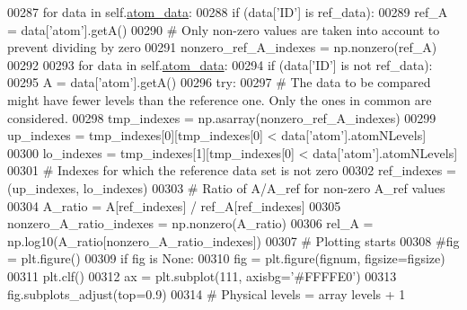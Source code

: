 \begin{DoxyCode}
00287         \textcolor{keywordflow}{for} data \textcolor{keywordflow}{in} self.\hyperlink{classpyneb_1_1plot_1_1plot_atomic_data_1_1_data_plot_aee33ad460a38cb4293a5bd89cec12294}{atom\_data}:
00288             \textcolor{keywordflow}{if} (data[\textcolor{stringliteral}{'ID'}] \textcolor{keywordflow}{is} ref\_data):
00289                 ref\_A = data[\textcolor{stringliteral}{'atom'}].getA()
00290                 \textcolor{comment}{# Only non-zero values are taken into account to prevent dividing by zero}
00291                 nonzero\_ref\_A\_indexes = np.nonzero(ref\_A)
00292 
00293         \textcolor{keywordflow}{for} data \textcolor{keywordflow}{in} self.\hyperlink{classpyneb_1_1plot_1_1plot_atomic_data_1_1_data_plot_aee33ad460a38cb4293a5bd89cec12294}{atom\_data}:
00294             \textcolor{keywordflow}{if} (data[\textcolor{stringliteral}{'ID'}] \textcolor{keywordflow}{is} \textcolor{keywordflow}{not} ref\_data):
00295                 A = data[\textcolor{stringliteral}{'atom'}].getA()
00296                 \textcolor{keywordflow}{try}:
00297                     \textcolor{comment}{# The data to be compared might have fewer levels than the reference one. Only the ones
       in common are considered.}
00298                     tmp\_indexes = np.asarray(nonzero\_ref\_A\_indexes) 
00299                     up\_indexes = tmp\_indexes[0][tmp\_indexes[0] < data[\textcolor{stringliteral}{'atom'}].atomNLevels]
00300                     lo\_indexes = tmp\_indexes[1][tmp\_indexes[0] < data[\textcolor{stringliteral}{'atom'}].atomNLevels]
00301                     \textcolor{comment}{# Indexes for which the reference data set is not zero}
00302                     ref\_indexes = (up\_indexes, lo\_indexes)
00303                     \textcolor{comment}{# Ratio of A/A\_ref for non-zero A\_ref values}
00304                     A\_ratio = A[ref\_indexes] / ref\_A[ref\_indexes]
00305                     nonzero\_A\_ratio\_indexes = np.nonzero(A\_ratio)
00306                     rel\_A = np.log10(A\_ratio[nonzero\_A\_ratio\_indexes])
00307                     \textcolor{comment}{# Plotting starts}
00308                     \textcolor{comment}{#fig = plt.figure()}
00309                     \textcolor{keywordflow}{if} fig \textcolor{keywordflow}{is} \textcolor{keywordtype}{None}:
00310                         fig = plt.figure(fignum, figsize=figsize)
00311                     plt.clf()
00312                     ax = plt.subplot(111, axisbg=\textcolor{stringliteral}{'#FFFFE0'})
00313                     fig.subplots\_adjust(top=0.9)
00314                     \textcolor{comment}{# Physical levels = array levels + 1}

\end{DoxyCode}

